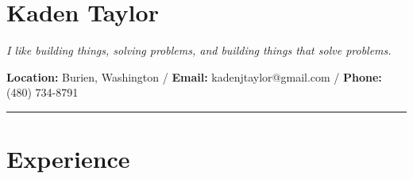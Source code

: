 \documentclass{article}
\begin{document}
\raggedright{\section*{Kaden Taylor}}
\textit{I like building things, solving problems, and building things that solve problems.}
\newline
\begin{center}
\textbf{Location:} Burien, Washington /
      \textbf{Email:} kadenjtaylor@gmail.com /
      \textbf{Phone:} (480) 734-8791
      
\end{center}
\noindent\rule{\linewidth}{1pt}

\raggedright{\section*{Experience}}
\end{document}
